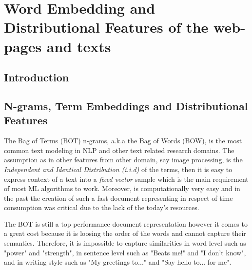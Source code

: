 
\chapter{Word Embedding and Distributional Features of the web-pages and texts}

\label{chap:word_embedding}



\newcommand{\keyword}[1]{\textbf{#1}}
\newcommand{\tabhead}[1]{\textbf{#1}}
\newcommand{\code}[1]{\texttt{#1}}
\newcommand{\file}[1]{\texttt{\bfseries#1}}
\newcommand{\option}[1]{\texttt{\itshape#1}}


\section{Introduction}\label{chap:word_embedding:sec:intro}
 

\section{N-grams, Term Embeddings and Distributional Features} \label{chap:word_embedding:sec:ngrans_vs_doc2vec}


The Bag of Terms (BOT) n-grams, a.k.a the Bag of Words (BOW), is the most common text modeling in NLP and other text related research domains. The assumption as in other features from other domain, say image processing, is the \textit{Independent and Identical Distribution (i.i.d)} of the terms, then it is easy to express context of a text into a \textit{fixed vector} sample which is the main requirement of most ML algorithms to work. Moreover, is computationally very easy and in the past the creation of such a fast document representing in respect of time consumption was critical due to the lack of the today's resources.

The BOT is still a top performance document representation however it comes to a great cost because it is loosing the order of the words and cannot capture their semantics. Therefore, it is impossible to capture similarities in word level such as "power" and "strength", in sentence level such as "Beats me!" and "I don't know", and in writing style such as "My greetings to..." and "Say hello to... for me". 

